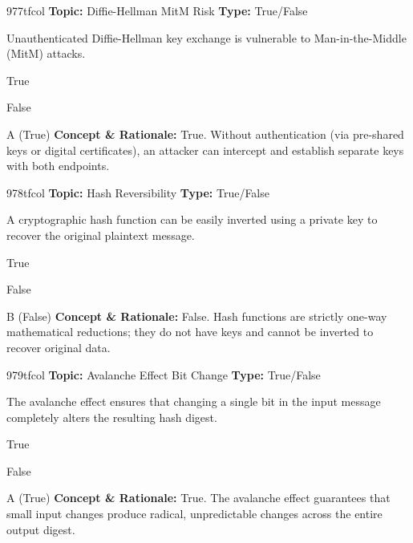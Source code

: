 \begin{qcard}{977}{tfcol}
\textcolor{darkslate!75}{\small\textbf{Topic:} Diffie-Hellman MitM Risk \hfill \textbf{Type:} True/False}\vspace{0.4em}\par
Unauthenticated Diffie-Hellman key exchange is vulnerable to Man-in-the-Middle (MitM) attacks.
\begin{qoptions}
\item True
\item False
\end{qoptions}
\end{qcard}
\nopagebreak
\begin{explainbox}{A (True)}
\textbf{Concept \& Rationale:} True. Without authentication (via pre-shared keys or digital certificates), an attacker can intercept and establish separate keys with both endpoints.
\end{explainbox}

\begin{qcard}{978}{tfcol}
\textcolor{darkslate!75}{\small\textbf{Topic:} Hash Reversibility \hfill \textbf{Type:} True/False}\vspace{0.4em}\par
A cryptographic hash function can be easily inverted using a private key to recover the original plaintext message.
\begin{qoptions}
\item True
\item False
\end{qoptions}
\end{qcard}
\nopagebreak
\begin{explainbox}{B (False)}
\textbf{Concept \& Rationale:} False. Hash functions are strictly one-way mathematical reductions; they do not have keys and cannot be inverted to recover original data.
\end{explainbox}

\begin{qcard}{979}{tfcol}
\textcolor{darkslate!75}{\small\textbf{Topic:} Avalanche Effect Bit Change \hfill \textbf{Type:} True/False}\vspace{0.4em}\par
The avalanche effect ensures that changing a single bit in the input message completely alters the resulting hash digest.
\begin{qoptions}
\item True
\item False
\end{qoptions}
\end{qcard}
\nopagebreak
\begin{explainbox}{A (True)}
\textbf{Concept \& Rationale:} True. The avalanche effect guarantees that small input changes produce radical, unpredictable changes across the entire output digest.
\end{explainbox}


